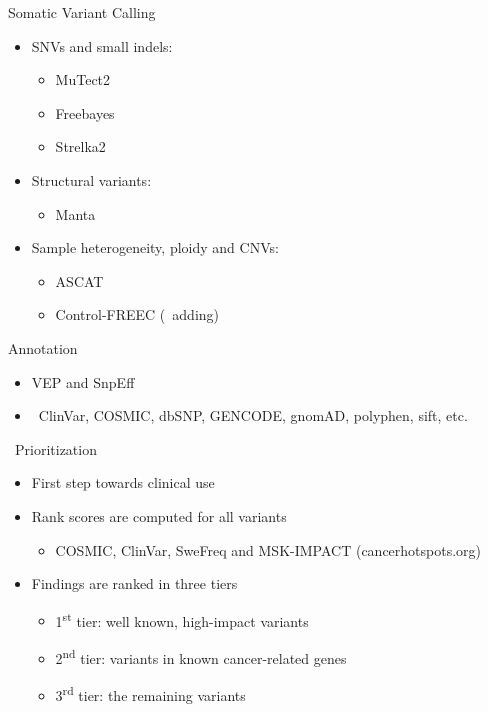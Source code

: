 \documentclass[usepdftitle=false]{beamer}
\newcommand{\ts}{\textsuperscript}
\begin{document}
\begin{frame}{Somatic Variant Calling}
	\begin{itemize}
		\item SNVs and small indels:
		\begin{itemize}
			\item MuTect2
			\item Freebayes
			\item Strelka2
		\end{itemize}
		\item Structural variants:
		\begin{itemize}
			\item Manta
		\end{itemize}
		\item Sample heterogeneity, ploidy and CNVs:
		\begin{itemize}
			\item ASCAT
			\item Control-FREEC (\faWrench\ adding)
		\end{itemize}
	\end{itemize}
\end{frame}

\begin{frame}{Annotation}
	\begin{itemize}
		\item VEP and SnpEff
		\item \faDatabase\ ClinVar, COSMIC, dbSNP, GENCODE, gnomAD, polyphen, sift, etc.
	\end{itemize}
\end{frame}


\begin{frame}{\faWrench\ Prioritization}
	\begin{itemize}
		\item	First step towards clinical use
		\item	Rank scores are computed for all variants
		\begin{itemize}
			\item	COSMIC, ClinVar, SweFreq and MSK-IMPACT (cancerhotspots.org)
		\end{itemize}
		\item	Findings are ranked in three tiers
		\begin{itemize}
			\item	1\ts{st} tier: well known, high-impact variants
			\item	2\ts{nd} tier: variants in known cancer-related genes
			\item	3\ts{rd} tier: the remaining variants
		\end{itemize}
	\end{itemize}
\end{frame}
\end{document}
